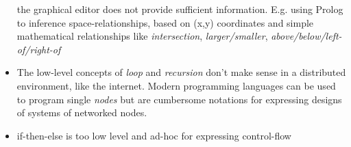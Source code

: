 \begin{itemize}
the graphical editor does not provide sufficient information. E.g. using Prolog to inference
space-relationships, based on (x,y) coordinates and simple mathematical relationships 
like \emph{intersection}, \emph{larger/smaller}, \emph{above/below/left-of/right-of}
\item The low-level concepts of \emph{loop} and \emph{recursion} don't make sense in a distributed environment, like the internet. Modern programming languages can be used to program single \emph{nodes} but are cumbersome notations for expressing designs of systems of networked nodes. 
\item if-then-else is too low level and ad-hoc for expressing control-flow
\end{itemize}
